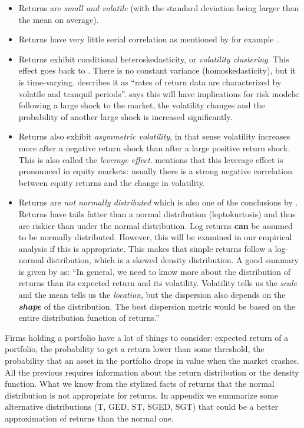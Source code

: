 \documentclass[a4paper, twoside]{templates/ociamthesis}
\providecommand{\tightlist}{%
  \setlength{\itemsep}{0pt}\setlength{\parskip}{0pt}}
\begin{document}
\begin{itemize}
\tightlist
\item
  Returns are \emph{small and volatile} (with the standard deviation being larger than the mean on average).
\item
  Returns have very little serial correlation as mentioned by for example \textcite{bollerslev1987}.
\item
  Returns exhibit conditional heteroskedasticity, or \emph{volatility clustering}. This effect goes back to \textcite{mandelbrot1963}. There is no constant variance (homoskedasticity), but it is time-varying. \textcite{bollerslev1987} describes it as ``rates of return data are characterized by volatile and tranquil periods''. \textcite{alexander2008} says this will have implications for risk models: following a large shock to the market, the volatility changes and the probability of another large shock is increased significantly.
\item
  Returns also exhibit \emph{asymmetric volatility}, in that sense volatility increases more after a negative return shock than after a large positive return shock. This is also called the \emph{leverage effect}. \textcite{alexander2008} mentions that this leverage effect is pronounced in equity markets: usually there is a strong negative correlation between equity returns and the change in volatility.
\item
  Returns are \emph{not normally distributed} which is also one of the conclusions by \textcite{fama1965}. Returns have tails fatter than a normal distribution (leptokurtosis) and thus are riskier than under the normal distribution. Log returns \textbf{can} be assumed to be normally distributed. However, this will be examined in our empirical analysis if this is appropriate. This makes that simple returns follow a log-normal distribution, which is a skewed density distribution. A good summary is given by \textcite{alexander2008} as: ``In general, we need to know more about the distribution of returns than its expected return and its volatility. Volatility tells us the \emph{scale} and the mean tells us the \emph{location}, but the dispersion also depends on the \textbf{\emph{shape}} of the distribution. The best dispersion metric would be based on the entire distribution function of returns.''
\end{itemize}

\noindent Firms holding a portfolio have a lot of things to consider: expected return of a portfolio, the probability to get a return lower than some threshold, the probability that an asset in the portfolio drops in value when the market crashes. All the previous requires information about the return distribution or the density function. What we know from the stylized facts of returns that the normal distribution is not appropriate for returns. In appendix we summarize some alternative distributions (T, GED, ST, SGED, SGT) that could be a better approximation of returns than the normal one.
\end{document}
